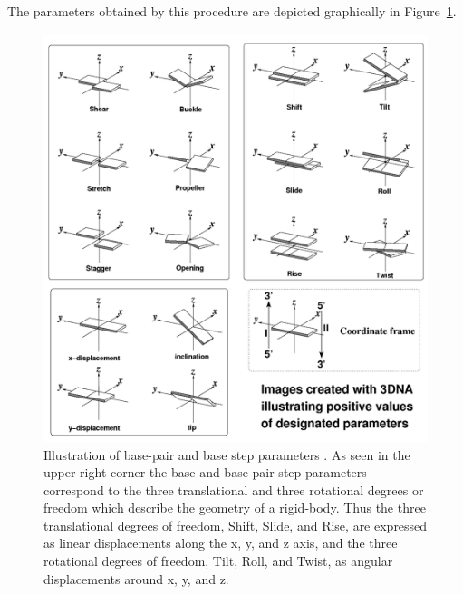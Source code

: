 The parameters obtained by  this procedure are depicted graphically in
Figure~\ref{fig:allparam}.
\begin{figure}[htbp]
\centering
\includegraphics[scale=0.6]{Chapter1/allparam2.png}
\caption{Illustration   of   base-pair   and  base   step   parameters
  \cite{lu2003}.   As seen  in the  upper  right corner  the base  and
  base-pair step parameters correspond  to the three translational and
  three rotational degrees or freedom which describe the geometry of a
  rigid-body. Thus the three  translational degrees of freedom, Shift,
  Slide, and Rise, are expressed  as linear displacements along the x,
  y, and z axis,  and the three  rotational degrees of  freedom, Tilt,
  Roll, and Twist, as angular displacements around x, y, and z.}
\label{fig:allparam}
\end{figure}


